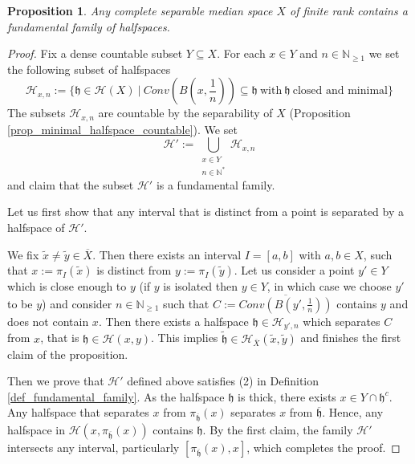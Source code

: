 \documentclass{amsart}
\numberwithin{equation}{section}
\newtheorem{prop}[thm]{Proposition}
\newcommand{\HH}{\mathcal{H}}     %
\newcommand{\HHb}{\mathcal{H}_{\bar{X}}}
\newcommand{\hh}{\mathfrak{h}}    %
\newcommand{\NN}{\mathbb{N}}      %
\theoremstyle{definition}
\def\bar{\overline}
\begin{document}
\begin{prop}\label{prop_existence_fundamental_family}
   Any complete separable median space $X$ of finite rank contains a fundamental family of halfspaces.
\end{prop}
\begin{proof}
Fix a dense countable subset $Y\subseteq X$. For each $x\in Y$ and $n\in\NN_{\geq 1}$ we set the following subset of halfspaces
\[
\HH_{x,n}:=\{\hh\in\HH(X)\ | \ Conv(B(x,\frac{1}{n}))\subseteq \hh \ \text{with} \ \hh \ \text{closed and minimal}\}
\]
The subsets $\HH_{x,n}$ are countable by the separability of $X$ (Proposition \ref{prop_minimal_halfspace_countable}). We set 
\[
\HH':=\bigcup_{\substack{x\in Y \\ n\in\NN^*}}\HH_{x,n}
\]
 and claim that the subset $\HH'$ is a fundamental family.\par
 Let us first show that any interval that is distinct from a point is separated by a halfspace of $\HH'$. \par 
 We fix $\tilde{x} \neq \tilde{y}\in \bar{X}$. Then there exists an interval $I=[a,b]$ with $a, b \in X$, such that $x:=\pi_I(\tilde{x})$ is distinct from $y:=\pi_I(\tilde{y})$. Let us consider a point $y'\in Y$ which is close enough to $y$ (if $y$ is isolated then $y\in Y$, in which case we choose $y'$ to be $y$) and consider $n\in\NN_{\geq 1}$ such that $C:=\bar{Conv(B(y',\frac{1}{n}))}$ contains $y$ and does not contain $x$. Then there exists a halfspace $\hh\in\HH_{y',n}$ which separates $C$ from $x$, that is $\hh\in\HH(x,y)$. This implies $\tilde{\hh}\in\HHb(\tilde{x},\tilde{y})$ and finishes the first claim of the proposition.\par 
 Then we prove that $\HH'$ defined above satisfies (2) in Definition \ref{def_fundamental_family}. As the halfspace $\hh$ is thick, there exists $x\in Y\cap\hh^c$. Any halfspace that separates $x$ from $\pi_{\bar{\hh}}(x)$ separates $x$ from $\bar{\hh}$. Hence, any halfspace in $\HH(x,\pi_{\bar{\hh}}(x))$ contains $\hh$. By the first claim, the family $\HH'$ intersects any interval, particularly $[\pi_{\bar{\hh}}(x),x]$, which completes the proof.
\end{proof}
\end{document}
